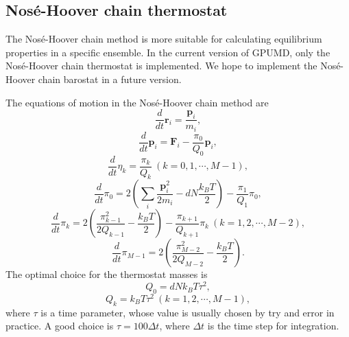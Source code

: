\documentclass[12pt,a4paper]{report}
\newcommand{\vect}[1]{\boldsymbol{#1}}
\begin{document}
\subsection{Nos\'e-Hoover chain thermostat}

The Nos\'e-Hoover chain method \cite{nose1984jcp,hoover1985pra,martyna1992jcp,martyna1996mp,tuckerman2010} is more suitable for calculating equilibrium properties in a specific ensemble. In the current version of GPUMD, only the Nos\'e-Hoover chain thermostat is implemented. We hope to implement the Nos\'e-Hoover chain barostat in a future version.

The equations of motion in the Nos\'{e}-Hoover chain method are
\begin{equation}
\frac{d}{dt} \vect{r}_i = \frac{\vect{p}_i}{m_i},
\end{equation}
\begin{equation}
\frac{d}{dt} \vect{p}_i = \vect{F}_i - \frac{\pi_0}{Q_0} \vect{p}_i,
\end{equation}
\begin{equation}
\frac{d}{dt} \eta_k = \frac{\pi_k}{Q_k} ~(k = 0, 1, \cdots, M-1),
\end{equation}
\begin{equation}
\frac{d}{dt} \pi_0 =
2\left(
\sum_i \frac{\vect{p}_i^2}{2m_i} - dN\frac{k_BT}{2}
\right)
- \frac{\pi_1}{Q_1} \pi_0,
\end{equation}
\begin{equation}
\frac{d}{dt} \pi_k =
2\left( \frac{\pi_{k-1}^2}{2Q_{k-1}} - \frac{k_BT}{2} \right)
- \frac{\pi_{k+1}}{Q_{k+1}} \pi_{k} ~(k = 1, 2, \cdots, M-2),
\end{equation}
\begin{equation}
\frac{d}{dt} \pi_{M-1} =
2\left( \frac{\pi_{M-2}^2}{2Q_{M-2}} - \frac{k_BT}{2} \right).
\end{equation}
The optimal choice \cite{martyna1992jcp} for the thermostat masses is
\begin{equation}
Q_0 = dNk_BT\tau^2,
\end{equation}
\begin{equation}
Q_k = k_BT\tau^2 ~(k = 1, 2, \cdots, M-1),
\end{equation}
where $\tau$ is a time parameter, whose value is usually chosen by try and error in practice. A good choice is $\tau = 100 \Delta t$, where $\Delta t$ is the time step for integration.
\end{document}
